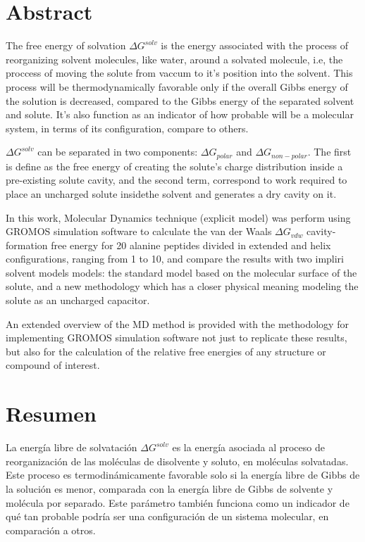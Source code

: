 \renewcommand{\baselinestretch}{2}

\section*{Abstract}
The free energy of solvation $\Delta G^{solv}$ is the energy associated with the process of reorganizing solvent molecules, like water, around a solvated molecule, i.e, the proccess of moving the solute from vaccum  to it's position into the solvent. This process will be thermodynamically favorable only if the overall Gibbs energy of the solution is decreased, compared to the Gibbs energy of the separated solvent and solute. It's also function as an indicator of how probable will be a molecular system, in terms of its configuration, compare to others. 

$\Delta G^{solv}$ can be separated in two components: $\Delta G_{polar}$ and $\Delta G_{non-polar}$. The first is define as the  free  energy  of  creating  the  solute’s  charge  distribution  inside  a pre-existing solute cavity, and the second term, correspond to work required to place an uncharged solute insidethe solvent and generates a dry cavity on it. 

In this work, Molecular Dynamics technique (explicit model) was perform using GROMOS simulation software to calculate the van der Waals $\Delta G_{vdw}$ cavity-formation free energy for 20 alanine peptides divided in extended and helix configurations, ranging from 1 to 10, and compare the results with two impliri solvent models models: the standard model based on the molecular surface of the solute, and a new methodology which has a closer physical meaning modeling the solute as an uncharged capacitor.

An extended overview of the MD method is provided with the methodology for implementing GROMOS simulation software not just to replicate these results, but also for the calculation of the relative free energies of any structure or compound of interest. 
\section*{Resumen}
La energía libre de solvatación $\Delta G^{solv}$ es la energía asociada al proceso de reorganización de las moléculas de disolvente y soluto, en moléculas solvatadas. Este proceso es termodinámicamente favorable solo si la energía libre de Gibbs de la solución es menor, comparada con la energía libre de Gibbs de solvente y molécula por separado. Este parámetro también funciona como un indicador de qué tan probable podría ser una configuración de un sistema molecular, en comparación a otros. 

